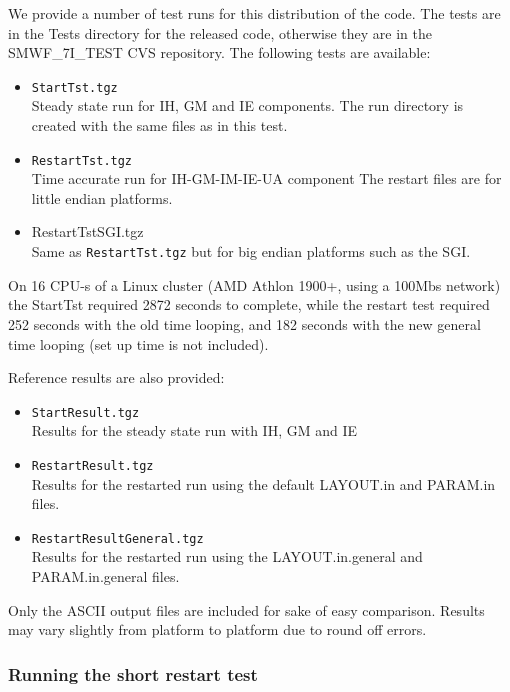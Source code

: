 We provide a number of test runs for this distribution of the code.
The tests are in the Tests directory for the released code, otherwise
they are in the SMWF\_7I\_TEST CVS repository.  The following tests
are available:
\begin{itemize}
\item {\tt StartTst.tgz}\\
      Steady state run for IH, GM and IE components.
      The run directory is created with the same files as in
      this test.

\item {\tt RestartTst.tgz}\\
      Time accurate run for IH-GM-IM-IE-UA component
      The restart files are for little endian platforms.

\item {RestartTstSGI.tgz}\\
      Same as {\tt RestartTst.tgz} 
      but for big endian platforms such as the SGI.
\end{itemize}
On 16 CPU-s of a Linux cluster (AMD Athlon 1900+, using a 100Mbs
network) the StartTst required 2872 seconds to complete, while the
restart test required 252 seconds with the old time looping, and 182
seconds with the new general time looping (set up time is not
included).

Reference results are also  provided:
\begin{itemize}
\item {\tt StartResult.tgz}\\
       Results for the steady state run with IH, GM and IE

\item {\tt RestartResult.tgz}\\
      Results for the restarted run using the default
       LAYOUT.in and PARAM.in files.

\item {\tt RestartResultGeneral.tgz}\\
      Results for the restarted run using the 
      LAYOUT.in.general and PARAM.in.general files.
\end{itemize}
Only the ASCII output files are included for sake of easy comparison.
Results may vary slightly from platform to platform due to round off errors.

\subsubsection{Running the short restart test}

